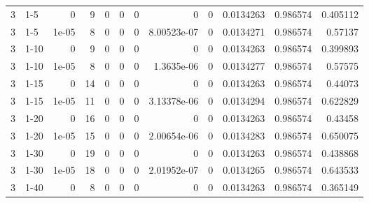 \begin{tabular}{rlrrrrrrrrrr}
     3 & 1-5    &      0     &           9 &                 0 &                 0 &     0           &     0           &      0           &        0.0134263 &               0.986574 &           0.405112 \\
     3 & 1-5    &      1e-05 &           8 &                 0 &                 0 &     0           &     8.00523e-07 &      0           &        0.0134271 &               0.986574 &           0.57137  \\
     3 & 1-10   &      0     &           9 &                 0 &                 0 &     0           &     0           &      0           &        0.0134263 &               0.986574 &           0.399893 \\
     3 & 1-10   &      1e-05 &           8 &                 0 &                 0 &     0           &     1.3635e-06  &      0           &        0.0134277 &               0.986574 &           0.57575  \\
     3 & 1-15   &      0     &          14 &                 0 &                 0 &     0           &     0           &      0           &        0.0134263 &               0.986574 &           0.44073  \\
     3 & 1-15   &      1e-05 &          11 &                 0 &                 0 &     0           &     3.13378e-06 &      0           &        0.0134294 &               0.986574 &           0.622829 \\
     3 & 1-20   &      0     &          16 &                 0 &                 0 &     0           &     0           &      0           &        0.0134263 &               0.986574 &           0.43458  \\
     3 & 1-20   &      1e-05 &          15 &                 0 &                 0 &     0           &     2.00654e-06 &      0           &        0.0134283 &               0.986574 &           0.650075 \\
     3 & 1-30   &      0     &          19 &                 0 &                 0 &     0           &     0           &      0           &        0.0134263 &               0.986574 &           0.438868 \\
     3 & 1-30   &      1e-05 &          18 &                 0 &                 0 &     0           &     2.01952e-07 &      0           &        0.0134265 &               0.986574 &           0.643533 \\
     3 & 1-40   &      0     &           8 &                 0 &                 0 &     0           &     0           &      0           &        0.0134263 &               0.986574 &           0.365149 \\

\end{tabular}
